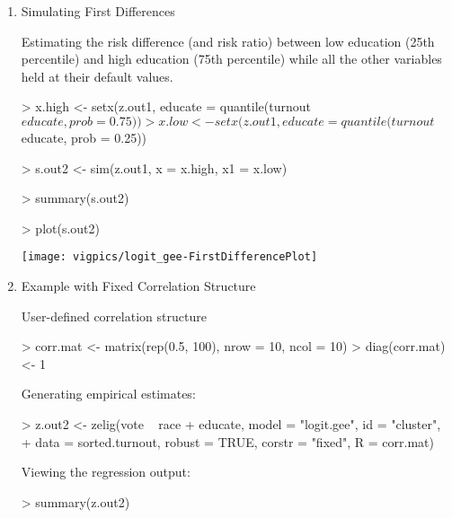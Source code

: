 \begin{enumerate}
\item {Simulating First Differences}

Estimating the risk difference (and risk ratio) between low education
(25th percentile) and high education (75th percentile) while all the
other variables held at their default values.

\begin{Schunk}
\begin{Sinput}
> x.high <- setx(z.out1, educate = quantile(turnout$educate, prob = 0.75))
> x.low <- setx(z.out1, educate = quantile(turnout$educate, prob = 0.25))
\end{Sinput}
\end{Schunk}

\begin{Schunk}
\begin{Sinput}
> s.out2 <- sim(z.out1, x = x.high, x1 = x.low)
\end{Sinput}
\end{Schunk}
\begin{Schunk}
\begin{Sinput}
> summary(s.out2)
\end{Sinput}
\end{Schunk}
\begin{center}
\begin{Schunk}
\begin{Sinput}
> plot(s.out2)
\end{Sinput}
\end{Schunk}
\texttt{[image: vigpics/logit\_gee-FirstDifferencePlot]}
\end{center}

\item  Example with Fixed Correlation Structure

User-defined correlation structure
\begin{Schunk}
\begin{Sinput}
> corr.mat <- matrix(rep(0.5, 100), nrow = 10, ncol = 10)
> diag(corr.mat) <- 1
\end{Sinput}
\end{Schunk}
Generating empirical estimates:
\begin{Schunk}
\begin{Sinput}
> z.out2 <- zelig(vote ~ race + educate, model = "logit.gee", id = "cluster", 
+     data = sorted.turnout, robust = TRUE, corstr = "fixed", R = corr.mat)
\end{Sinput}
\end{Schunk}
Viewing the regression output:
\begin{Schunk}
\begin{Sinput}
> summary(z.out2)
\end{Sinput}
\end{Schunk}
\end{enumerate}

